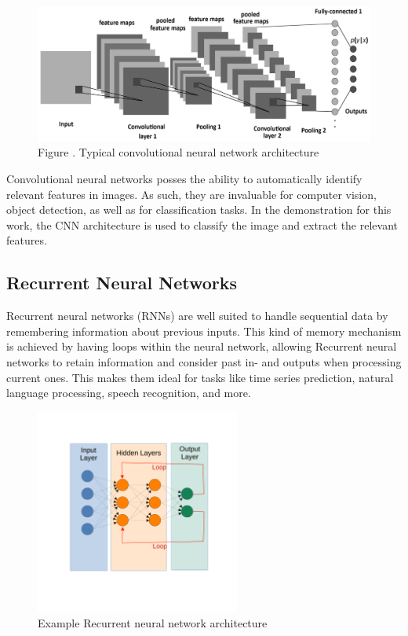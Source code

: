 \documentclass[12pt, a4paper, titlepage]{report}
\begin{document}
\begin{figure}[h]
	\centering
	\includegraphics[width=1.0\textwidth]{../rc/images/cnn_architecture.png}
   \caption{Figure \cite{img_cnn_architecture}. Typical convolutional neural network architecture}
	\label{fig:cnn_architecture}
\end{figure}


Convolutional neural networks posses the ability to automatically identify relevant features in images. As such, they are invaluable for computer vision, object detection, as well as for classification tasks. In the demonstration for this work, the CNN architecture is used to classify the image and extract the relevant features.


\subsection{Recurrent Neural Networks}

Recurrent neural networks (RNNs) are well suited to handle sequential data by remembering information about previous inputs. This kind of memory mechanism is achieved by having loops within the neural network, allowing Recurrent neural networks to retain information and consider past in- and outputs when processing current ones. This makes them ideal for tasks like time series prediction, natural language processing, speech recognition, and more.

\begin{figure}[h]
   \centering
	\includegraphics[width=0.6\textwidth]{../rc/images/rnn_architecture.pdf}
   \caption{Example Recurrent neural network architecture \cite{img_rnn_architecture}}
	\label{fig:rnn_architecture}
\end{figure}
\end{document}
